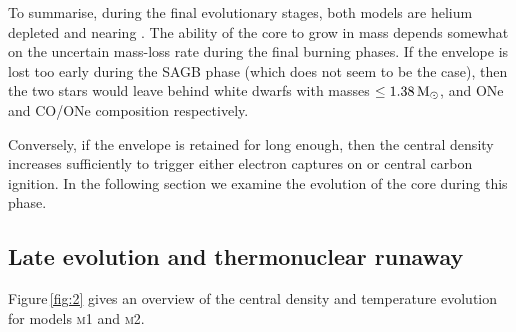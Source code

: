 \documentclass[../../main/thesis_msc.tex]{subfiles}
\begin{document}
To summarise, during the final evolutionary stages, both models are helium 
depleted and nearing \mch. The ability of the core 
to grow in mass depends somewhat on the uncertain mass-loss rate during the final burning phases. If the envelope 
is lost too early during the SAGB phase (which does not seem to be the case), then the two stars would 
leave behind white dwarfs with masses $\le 1.38\mathrm{\,M_\odot}$, and ONe and CO/ONe composition respectively. 

Conversely, if the envelope is retained for long enough, then the central density increases sufficiently to trigger either electron captures on  or central carbon ignition. 
In the following section we examine the evolution of the core during this phase. 




\subsection{Late evolution and thermonuclear runaway}\label{sec:runway}
Figure\,\ref{fig:2} gives an overview of the central density and temperature evolution for models  \textsc{m1} and \textsc{m2}. %
\end{document}
